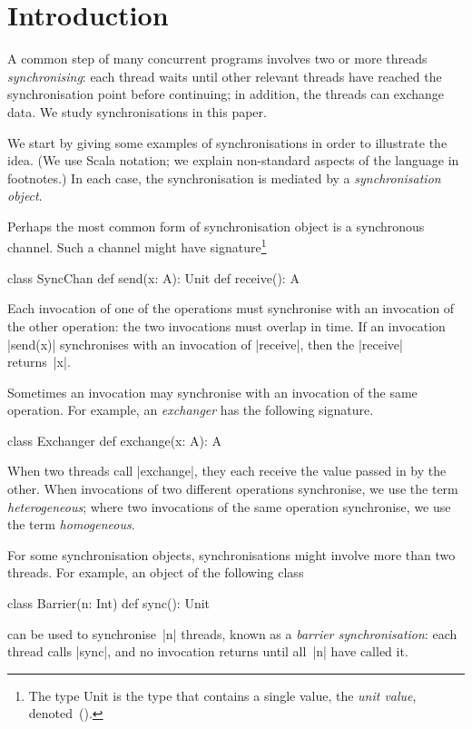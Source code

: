 
\section{Introduction}

A common step of many concurrent programs involves two or more threads
\emph{synchronising}: each thread waits until other relevant threads have
reached the synchronisation point before continuing; in addition, the threads
can exchange data.  We study synchronisations in this paper.

We start by giving some examples of synchronisations in order to illustrate
the idea.  (We use Scala notation; we explain non-standard aspects of the
language in footnotes.)  In each case, the synchronisation is mediated by a
\emph{synchronisation object}.

Perhaps the most common form of synchronisation object is a synchronous
channel.  Such a channel might have signature\footnote{The type {\scalashape
    Unit} is the type that contains a single value, the \emph{unit value},
  denoted~{\scalashape ()}.}
%
\begin{scala}
class SyncChan{
  def send(x: A): Unit
  def receive(): A
}
\end{scala}
%
Each invocation of one of the operations must synchronise with an invocation
of the other operation: the two invocations must overlap in time.  If an
invocation |send(x)| synchronises with an invocation of |receive|, then the
|receive| returns~|x|.

Sometimes an invocation may synchronise with an invocation of the same
operation.  For example, an \emph{exchanger} has the following signature.
%
\begin{scala}
class Exchanger{
  def exchange(x: A): A
}
\end{scala}
%
When two threads call |exchange|, they each receive the value passed in by the
other.  When invocations of two different operations synchronise, we use the
term \emph{heterogeneous}; where two invocations of the same operation
synchronise, we use the term \emph{homogeneous}.  

For some synchronisation objects, synchronisations might involve more than two
threads.  For example, an object of the following class
%
\begin{scala}
class Barrier(n: Int){
  def sync(): Unit
}
\end{scala}
%
can be used to synchronise~|n| threads, known as a \emph{barrier
  synchronisation}: each thread calls |sync|, and no invocation returns until
all~|n| have called it.

